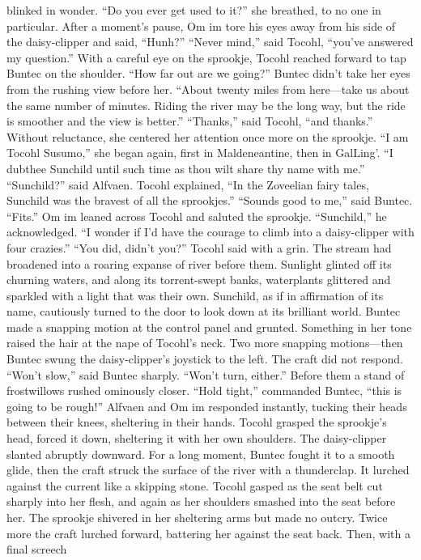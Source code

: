 \documentclass[9pt]{article}
\begin{document}
blinked in wonder.
“Do you ever get used to it?” she breathed, to no one in particular. After a moment’s pause, Om im
tore his eyes away from his side of the daisy-clipper and said, “Hunh?”
“Never mind,” said Tocohl, “you’ve answered my question.” With a careful eye on the sprookje,
Tocohl reached forward to tap Buntec on the shoulder. “How far out are we going?”
Buntec didn’t take her eyes from the rushing view before her. “About twenty miles from here—take
us about the same number of minutes. Riding the river may be the long way, but the ride is smoother and
the view is better.”
“Thanks,” said Tocohl, “and thanks.” Without reluctance, she centered her attention once more on
the sprookje. “I am Tocohl Susumo,” she began again, first in Maldeneantine, then in GalLing’. “I dubthee Sunchild until such time as thou wilt share thy name with me.”
“Sunchild?” said Alfvaen.
Tocohl explained, “In the Zoveelian fairy tales, Sunchild was the bravest of all the sprookjes.”
“Sounds good to me,” said Buntec. “Fits.”
Om im leaned across Tocohl and saluted the sprookje. “Sunchild,” he acknowledged. “I wonder if
I’d have the courage to climb into a daisy-clipper with four crazies.”
“You did, didn’t you?” Tocohl said with a grin.
The stream had broadened into a roaring expanse of river before them. Sunlight glinted off its
churning waters, and along its torrent-swept banks, waterplants glittered and sparkled with a light that
was their own. Sunchild, as if in affirmation of its name, cautiously turned to the door to look down at its
brilliant world.
Buntec made a snapping motion at the control panel and grunted. Something in her tone raised the
hair at the nape of Tocohl’s neck. Two more snapping motions—then Buntec swung the daisy-clipper’s
joystick to the left. The craft did not respond.
“Won’t slow,” said Buntec sharply. “Won’t turn, either.”
Before them a stand of frostwillows rushed ominously closer. “Hold tight,” commanded Buntec, “this
is going to be rough!”
Alfvaen and Om im responded instantly, tucking their heads between their knees, sheltering in their
hands. Tocohl grasped the sprookje’s head, forced it down, sheltering it with her own shoulders.
The daisy-clipper slanted abruptly downward. For a long moment, Buntec fought it to a smooth
glide, then the craft struck the surface of the river with a thunderclap. It lurched against the current like a
skipping stone.
Tocohl gasped as the seat belt cut sharply into her flesh, and again as her shoulders smashed into the
seat before her. The sprookje shivered in her sheltering arms but made no outcry.
Twice more the craft lurched forward, battering her against the seat back. Then, with a final screech
\end{document}
